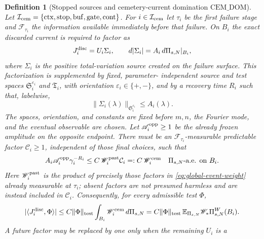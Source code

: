\documentclass[11pt]{article}
\newtheorem{definition}[theorem]{Definition}
\begin{document}
\begin{definition}[Stopped sources and cemetery-current domination
$\mathrm{CEM\_DOM}$]
\label{def:cemetery-source-domination}
Let
$\mathcal I_{\rm cem}=\{\mathrm{ctx},\mathrm{stop},\mathrm{buf},
\mathrm{gate},\mathrm{cont}\}$.  For $i\in\mathcal I_{\rm cem}$ let
$\tau_i$ be the first failure stage and $\mathcal F_{\tau_i}$ the information
available immediately before that failure.  On $B_i$ the exact discarded
current is required to factor as
\begin{equation}
\label{eq:exact-stopped-source-factorization}
 J_i^{\rm disc}=U_i\Sigma_i,
 \qquad d|\Sigma_i|=A_i\,d\Pi_{s,N}|_{B_i},
\end{equation}
where $\Sigma_i$ is the positive total-variation source created on the
failure surface.  This factorization is supplemented by fixed, parameter-
independent source and test spaces
$\mathfrak S_i^{\varepsilon_i}$ and $\mathfrak T_i$, with
orientation $\varepsilon_i\in\{+,-\}$, and by a recovery time $R_i$ such
that, labelwise,
\begin{equation}
\label{eq:cemetery-fixed-source-norm}
 \|\Sigma_i(\lambda)\|_{\mathfrak S_i^{\varepsilon_i}}
 \le A_i(\lambda).
\end{equation}
The spaces, orientation, and constants are fixed before $m,n$, the Fourier
mode, and the eventual observable are chosen.  Let
$\mathscr A_i^{\rm opp}\ge1$ be the already frozen amplitude on the opposite
endpoint.  There must be an $\mathcal F_{\tau_i}$-measurable predictable
factor $\mathcal C_i\ge1$, independent of those final choices, such that
\begin{equation}
\label{eq:cemetery-RN-domination}
 A_i\mathscr A_i^{\rm opp}\gamma_i^{-R_i}
 \le C\,\mathscr W_{i}^{\rm past}\mathcal C_i
 =:C\,\mathscr W_i^{\rm cem}
 \quad\Pi_{s,N}\text{-a.e. on }B_i.
\end{equation}
Here $\mathscr W_i^{\rm past}$ is the product of precisely those factors in
\eqref{eq:global-event-weight} already measurable at $\tau_i$; absent
factors are not presumed harmless and are instead included in
$\mathcal C_i$.
Consequently, for every admissible test $\Phi$,
\begin{equation}
\label{eq:cemetery-current-weighted-bound}
 |\langle J_i^{\rm disc},\Phi\rangle|
 \le C\|\Phi\|_{\rm test}
       \int_{B_i}\mathscr W_i^{\rm cem}\,d\Pi_{s,N}
 =C\|\Phi\|_{\rm test}\,
   \mathbb E_{\Pi_{s,N}}\mathscr W_*
   \Pi_{s,N}^{W}(B_i).
\end{equation}
A future factor may be replaced by one only when the remaining $U_i$ is a

\end{definition}
\end{document}
